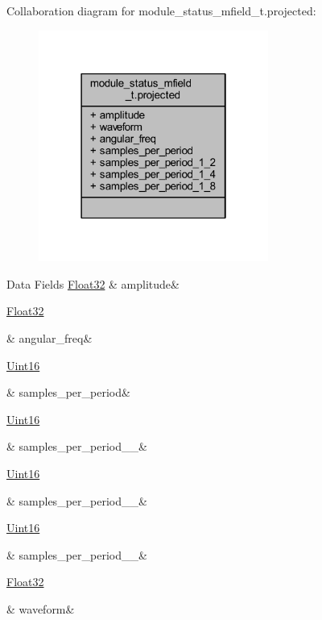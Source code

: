 Collaboration diagram for module\+\_\+status\+\_\+mfield\+\_\+t.\+projected\+:\nopagebreak
\begin{figure}[H]
\begin{center}
\leavevmode
\includegraphics[width=214pt]{d1/df7/a00957}
\end{center}
\end{figure}
\begin{DoxyFields}{Data Fields}
\hypertarget{a00019_addbe18f9e817f99576a6b19f4ef7ea11}{\hyperlink{a00072_a87d38f886e617ced2698fc55afa07637}{Float32}}\label{a00019_addbe18f9e817f99576a6b19f4ef7ea11}
&
amplitude&
\\
\hline

\hypertarget{a00019_ac545c73a0cc0262b35237116428a056c}{\hyperlink{a00072_a87d38f886e617ced2698fc55afa07637}{Float32}}\label{a00019_ac545c73a0cc0262b35237116428a056c}
&
angular\+\_\+freq&
\\
\hline

\hypertarget{a00019_a74325e9c3b21529f768fbd60221ea39f}{\hyperlink{a00072_a59a9f6be4562c327cbfb4f7e8e18f08b}{Uint16}}\label{a00019_a74325e9c3b21529f768fbd60221ea39f}
&
samples\+\_\+per\+\_\+period&
\\
\hline

\hypertarget{a00019_add4662ab6e160d520e35022f19cdc3af}{\hyperlink{a00072_a59a9f6be4562c327cbfb4f7e8e18f08b}{Uint16}}\label{a00019_add4662ab6e160d520e35022f19cdc3af}
&
samples\+\_\+per\+\_\+period\+\_\+\_&
\\
\hline

\hypertarget{a00019_aeb19217c67e603ecd704ada2fb8e0cd0}{\hyperlink{a00072_a59a9f6be4562c327cbfb4f7e8e18f08b}{Uint16}}\label{a00019_aeb19217c67e603ecd704ada2fb8e0cd0}
&
samples\+\_\+per\+\_\+period\+\_\+\_&
\\
\hline

\hypertarget{a00019_a5b8ad6400f77e60b3a53917cc504a024}{\hyperlink{a00072_a59a9f6be4562c327cbfb4f7e8e18f08b}{Uint16}}\label{a00019_a5b8ad6400f77e60b3a53917cc504a024}
&
samples\+\_\+per\+\_\+period\+\_\+\_&
\\
\hline

\hypertarget{a00019_a7ef99e069cfb82cb0ab0aa517acc5481}{\hyperlink{a00072_a87d38f886e617ced2698fc55afa07637}{Float32}}\label{a00019_a7ef99e069cfb82cb0ab0aa517acc5481}
&
waveform&
\\
\hline

\end{DoxyFields}
